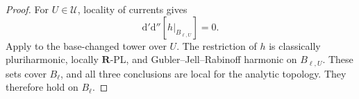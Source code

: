 \begin{proof}
For $U\in\mathcal U$, locality of currents gives
\[
 \mathrm d'\mathrm d''[h|_{B_{\ell,U}}]=0.
\]
Apply  to the
base-changed tower over $U$.  The restriction of $h$ is classically
pluriharmonic, locally $\mathbf R$-PL, and Gubler--Jell--Rabinoff harmonic
on $B_{\ell,U}$.  These sets cover $B_\ell$, and all three conclusions are
local for the analytic topology.  They therefore hold on $B_\ell$.
\end{proof}
